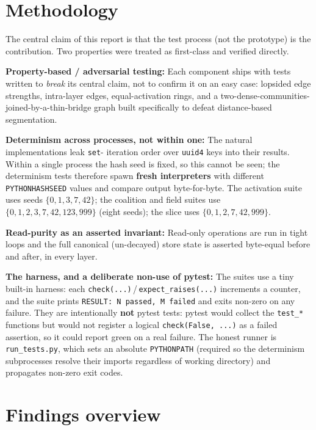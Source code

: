 \documentclass[11pt]{article}
\newcommand{\code}[1]{\texttt{#1}}
\begin{document}
\section{Methodology}\label{sec:method}

The central claim of this report is that the test process (not the prototype) is the contribution. Two
properties were treated as first-class and verified directly.

\textbf{Property-based / adversarial testing:} Each component ships with tests written to \emph{break}
its central claim, not to confirm it on an easy case: lopsided edge strengths, intra-layer edges,
equal-activation rings, and a two-dense-communities-joined-by-a-thin-bridge graph built specifically to
defeat distance-based segmentation.

\textbf{Determinism across processes, not within one:} The natural implementations leak \code{set}-
iteration order over \code{uuid4} keys into their results. Within a single process the hash seed is
fixed, so this cannot be seen; the determinism tests therefore spawn \textbf{fresh interpreters} with
different \code{PYTHONHASHSEED} values and compare output byte-for-byte. The activation suite uses seeds
$\{0,1,3,7,42\}$; the coalition and field suites use $\{0,1,2,3,7,42,123,999\}$ (eight seeds); the slice
uses $\{0,1,2,7,42,999\}$.

\textbf{Read-purity as an asserted invariant:} Read-only operations are run in tight loops and the full
canonical (un-decayed) store state is asserted byte-equal before and after, in every layer.

\textbf{The harness, and a deliberate non-use of pytest:} The suites use a tiny built-in harness: each
\code{check(...)}\,/\,\code{expect_raises(...)} increments a counter, and the suite prints
\code{RESULT: N passed, M failed} and exits non-zero on any failure. They are intentionally \textbf{not}
pytest tests: pytest would collect the \code{test_*} functions but would not register a logical
\code{check(False, ...)} as a failed assertion, so it could report green on a real failure. The honest
runner is \code{run_tests.py}, which sets an absolute \code{PYTHONPATH} (required so the determinism
subprocesses resolve their imports regardless of working directory) and propagates non-zero exit codes.

\section{Findings overview}
\end{document}

